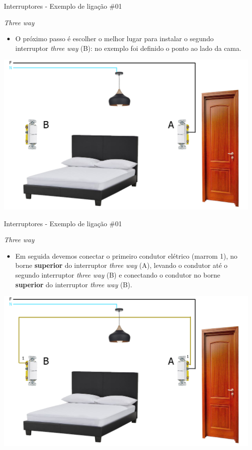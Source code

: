 \begin{frame}{Interruptores - Exemplo de ligação \#01}
	\begin{block}{\textit{Three way}}
		\begin{itemize}
			\item O próximo passo é escolher o melhor lugar para instalar o segundo interruptor \textit{three way} (B): no exemplo foi definido o ponto ao lado da cama.
		\end{itemize}
	\end{block}

	\bigskip

	\centering
	\includegraphics[width=0.7\linewidth]{Figuras/Ch08/fig20.1}
\end{frame}


\begin{frame}{Interruptores - Exemplo de ligação \#01}
	\begin{block}{\textit{Three way}}
		\begin{itemize}
			\item Em seguida devemos conectar o primeiro condutor elétrico (marrom 1), no borne \textbf{superior} do interruptor \textit{three way} (A), levando o condutor até o segundo interruptor \textit{three way} (B) e conectando o condutor no borne \textbf{superior} do interruptor \textit{three way} (B).
		\end{itemize}
	\end{block}

	\medskip

	\centering
	\includegraphics[width=0.65\linewidth]{Figuras/Ch08/fig20.2}
\end{frame}


